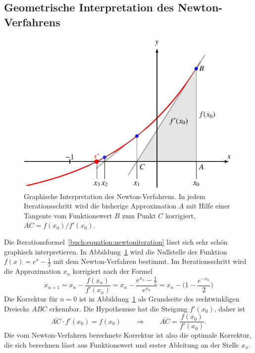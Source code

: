 \subsection{Geometrische Interpretation des Newton-Verfahrens}
\begin{figure}
\centering
\includegraphics{chapters/20-gleichungen/figures/newton.pdf}
\caption{Graphische Interpretation des Newton-Verfahrens.
In jedem Iterationsschritt wird die bisherige Approximation $A$
mit Hilfe einer Tangente vom Funktionswert $B$ zum Punkt $C$
korrigiert, $\overline{AC}=f(x_0)/f'(x_0)$.
\label{buch:figure:newton}}
\end{figure}
Die Iterationsformel~\eqref{buch:equation:newtoniteration}
lässt sich sehr schön graphisch interpretieren.
In Abbildung~\ref{buch:figure:newton} wird die Nullstelle der
Funktion $f(x) = e^x-\frac12$ mit dem Newton-Verfahren bestimmt.
Im Iterationsschritt wird die Approximation $x_n$ korrigiert
nach der Formel
\[
x_{n+1}
=
x_n - \frac{f(x_n)}{f'(x_n)}
=
x_n - \frac{e^{x_n}-\frac12}{e^{x_n}}
=
x_n - \biggl(1 -\frac{e^{-x_n}}{2}\biggr)
\]
Die Korrektur für $n=0$ ist in Abbildung~\ref{buch:figure:newton}
als Grundseite des rechtwinkligen Dreiecks $ABC$ erkennbar.
Die Hypothenuse hat die Steigung $f'(x_0)$, daher ist
\[
\overline{AC}\cdot f'(x_0) = f(x_0)
\qquad\Rightarrow\qquad
\overline{AC} = \frac{f(x_0)}{f'(x_0)}.
\]
Die vom Newton-Verfahren berechnete Korrektur ist also die optimale
Korrektur, die sich berechnen lässt aus Funktionswert und erster Ableitung
an der Stelle $x_n$.

